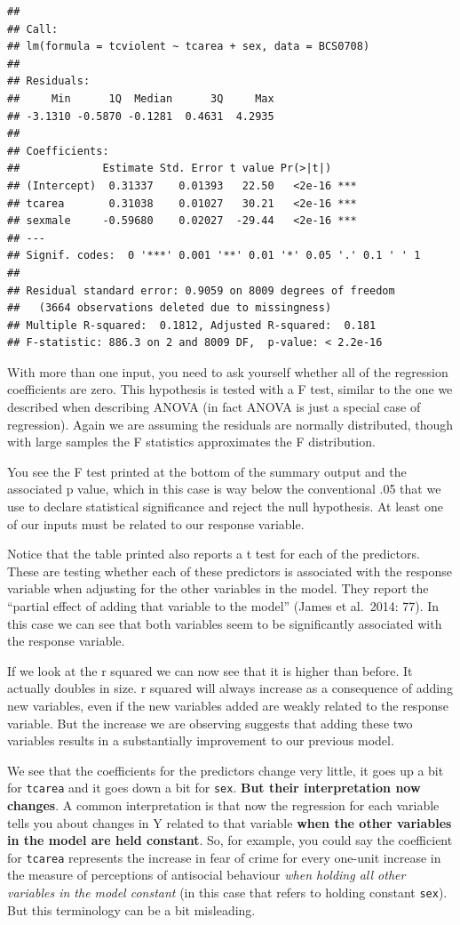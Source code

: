 \documentclass[]{book}
\theoremstyle{definition}
\theoremstyle{definition}
\theoremstyle{definition}
\theoremstyle{remark}
\begin{document}
\begin{verbatim}
## 
## Call:
## lm(formula = tcviolent ~ tcarea + sex, data = BCS0708)
## 
## Residuals:
##     Min      1Q  Median      3Q     Max 
## -3.1310 -0.5870 -0.1281  0.4631  4.2935 
## 
## Coefficients:
##             Estimate Std. Error t value Pr(>|t|)    
## (Intercept)  0.31337    0.01393   22.50   <2e-16 ***
## tcarea       0.31038    0.01027   30.21   <2e-16 ***
## sexmale     -0.59680    0.02027  -29.44   <2e-16 ***
## ---
## Signif. codes:  0 '***' 0.001 '**' 0.01 '*' 0.05 '.' 0.1 ' ' 1
## 
## Residual standard error: 0.9059 on 8009 degrees of freedom
##   (3664 observations deleted due to missingness)
## Multiple R-squared:  0.1812, Adjusted R-squared:  0.181 
## F-statistic: 886.3 on 2 and 8009 DF,  p-value: < 2.2e-16
\end{verbatim}

With more than one input, you need to ask yourself whether all of the
regression coefficients are zero. This hypothesis is tested with a F
test, similar to the one we described when describing ANOVA (in fact
ANOVA is just a special case of regression). Again we are assuming the
residuals are normally distributed, though with large samples the F
statistics approximates the F distribution.

You see the F test printed at the bottom of the summary output and the
associated p value, which in this case is way below the conventional .05
that we use to declare statistical significance and reject the null
hypothesis. At least one of our inputs must be related to our response
variable.

Notice that the table printed also reports a t test for each of the
predictors. These are testing whether each of these predictors is
associated with the response variable when adjusting for the other
variables in the model. They report the ``partial effect of adding that
variable to the model'' (James et al.~2014: 77). In this case we can see
that both variables seem to be significantly associated with the
response variable.

If we look at the r squared we can now see that it is higher than
before. It actually doubles in size. r squared will always increase as a
consequence of adding new variables, even if the new variables added are
weakly related to the response variable. But the increase we are
observing suggests that adding these two variables results in a
substantially improvement to our previous model.

We see that the coefficients for the predictors change very little, it
goes up a bit for \texttt{tcarea} and it goes down a bit for
\texttt{sex}. \textbf{But their interpretation now changes}. A common
interpretation is that now the regression for each variable tells you
about changes in Y related to that variable \textbf{when the other
variables in the model are held constant}. So, for example, you could
say the coefficient for \texttt{tcarea} represents the increase in fear
of crime for every one-unit increase in the measure of perceptions of
antisocial behaviour \emph{when holding all other variables in the model
constant} (in this case that refers to holding constant \texttt{sex}).
But this terminology can be a bit misleading.
\end{document}
